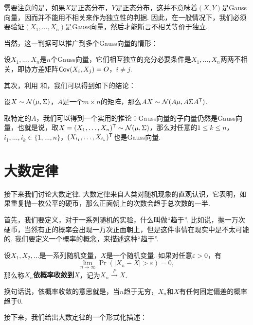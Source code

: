 需要注意的是，如果$X$是正态分布，$Y$是正态分布，这并不意味着$(X,Y)$是Gauss向量，因而并不能用不相关来作为独立性的判据. 因此，在一般情况下，我们必须要验证$(X_1,\dots,X_n)$是Gauss向量，然后才能断言不相关等价于独立. 

当然，这一判据可以推广到多个Gauss向量的情形：

\begin{corollary}\label{corollary:gauss-vector-independence-2}
设$X_1,\dots,X_n$是$n$个Gauss向量，它们相互独立的充分必要条件是$X_1,\dots,X_n$两两不相关，即协方差矩阵$\mathsf{Cov}(X_i,X_j)=O$，$i\neq j$.
\end{corollary}


其次，利用 和，我们可以得到如下的结论：

\begin{theorem}\label{theorem:gauss-vector-linear}
设$X\sim\mathcal{N}(\mu,\Sigma)$，$A$是一个$m\times n$的矩阵，那么$AX\sim\mathcal{N}(A\mu,A\Sigma A^{\mathsf{T}})$.
\end{theorem}

取特定的$A$，我们可以得到一个实用的推论：Gauss向量的子向量仍然是Gauss向量，也就是说，取$X=(X_1,\dots,X_n)^{\mathsf{T}}\sim\mathcal{N}(\mu,\Sigma)$，那么对任意的$1\leq k\leq n$，$i_1,\dots,i_k\in\{1,\dots,n\}$，$(X_{i_1},\dots,X_{i_k})^{\mathsf{T}}$也是Gauss向量. 

\section{大数定律}

接下来我们讨论大数定律. 大数定律来自人类对随机现象的直观认识，它表明，如果重复抛一枚公平的硬币，那么正面朝上的次数会趋于总次数的一半.

首先，我们要定义，对于一系列随机的实验，什么叫做“趋于”. 比如说，抛一万次硬币，当然有正的概率会出现一万次正面朝上，但是这件事情在现实中是不太可能的. 我们要定义一个概率的概念，来描述这种“趋于”.

\begin{definition}[依概率收敛]
设$X_1,X_2,\dots$是一系列随机变量，$X$是一个随机变量. 如果对任意$\varepsilon>0$，有
\[\lim_{n\to\infty}\Pr(|X_n-X|>\varepsilon)=0,\]
那么称\textbf{$X_n$依概率收敛到$X$}，记为$X_n\stackrel{P}{\to}X$.
\end{definition}
换句话说，依概率收敛的意思就是，当$n$趋于无穷，$X_n$和$X$有任何固定偏差的概率趋于$0$.

接下来，我们给出大数定律的一个形式化描述：

